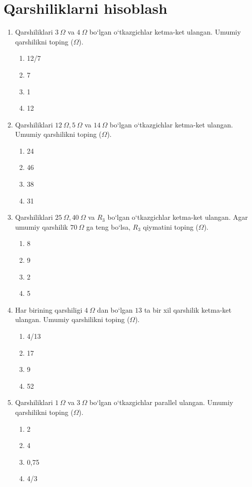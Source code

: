 \section{Qarshiliklarni hisoblash}


\begin{enumerate}

\item Qarshiliklari $3~\Omega$ va $4~\Omega$ bo‘lgan o‘tkazgichlar ketma-ket ulangan. Umumiy qarshilikni toping ($\Omega$). 
\begin{enumerate}[label=\Alph*)]
\item 12/7
\item 7
\item 1
\item 12
\end{enumerate}

\item Qarshiliklari $12~\Omega, 5~\Omega$ va $14~\Omega$ bo‘lgan o‘tkazgichlar ketma-ket ulangan. Umumiy qarshilikni toping ($\Omega$).
\begin{enumerate}[label=\Alph*)]
\item 24
\item 46
\item 38
\item 31
\end{enumerate}

\item Qarshiliklari $25~\Omega, 40~\Omega$ va $R_3$ bo‘lgan o‘tkazgichlar ketma-ket ulangan. Agar umumiy qarshilik $70~\Omega$ ga teng bo‘lsa, $R_3$ qiymatini toping ($\Omega$).
\begin{enumerate}[label=\Alph*)]
\item 8
\item 9
\item 2
\item 5
\end{enumerate}

\item Har birining qarshiligi $4~\Omega$ dan bo‘lgan $13$ ta bir xil qarshilik ketma-ket ulangan. Umumiy qarshilikni toping ($\Omega$). 
\begin{enumerate}[label=\Alph*)]
\item 4/13
\item 17
\item 9
\item 52
\end{enumerate}

\item Qarshiliklari $1~\Omega$ va $3~\Omega$ bo‘lgan o‘tkazgichlar parallel ulangan. Umumiy qarshilikni toping ($\Omega$). 
\begin{enumerate}[label=\Alph*)]
\item 2
\item 4
\item 0,75
\item 4/3
\end{enumerate}


\end{enumerate}
